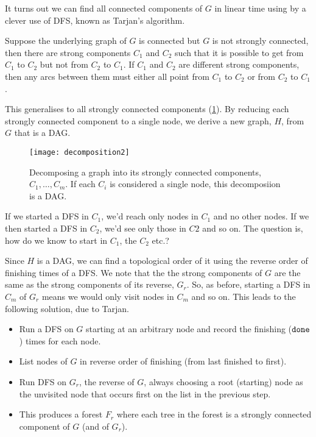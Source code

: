 It turns out we can find all connected components of $G$ in linear time using by a clever use of DFS, known as Tarjan's algorithm.

Suppose the underlying graph of $G$ is connected but $G$ is
not strongly connected, then  there are strong components $C_1$ and
$C_2$ such that it is possible to get from $C_1$ to $C_2$ but not
from $C_2$ to $C_1$. If $C_1$ and $C_2$ are different strong
components, then any arcs between them must either all point from
$C_1$ to $C_2$ or from $C_2$ to $C_1$.  

This generalises to all strongly connected components (\cref{fig:sccdecomp}). By reducing each strongly connected component to a single node, we derive a new graph, $H$, from $G$ that is a DAG.

\begin{figure}[h]
\centering
\texttt{[image: decomposition2]}
\caption{Decomposing a graph into its strongly connected components, $C_1, \ldots, C_m$. If each $C_i$ is considered a single node, this decomposiion is a DAG.}
 \label{fig:sccdecomp}
\end{figure}

If we started a DFS in $C_1$, we'd reach only nodes in $C_1$ and no other nodes. If we then started a DFS in $C_2$, we'd see only those in $C2$ and so on. The question is, how do we know to start in $C_1$, the $C_2$ etc.?

Since $H$ is a DAG, we can find a topological order of it using the reverse order of finishing times of a DFS. We  note that the the strong components of $G$ are the same as the strong components of its reverse, $G_r$. So, as before, starting a DFS in $C_m$ of $G_r$ means we would only visit nodes in $C_m$ and so on. This leads to the following solution, due to Tarjan.


\begin{itemize}
\item Run a DFS on $G$ starting at an arbitrary node and record the finishing ($\operatorname{\text{\texttt{done}}}$) times for each node.
\item List nodes of $G$ in reverse order of finishing (from last finished to first).
\item Run DFS on $G_r$, the reverse of $G$, always choosing a root (starting) node as the unvisited node that occurs first on the list in the previous step.
\item This produces a forest $F_r$ where each tree in the forest is a strongly connected component of $G$ (and of $G_r$).
\end{itemize}


